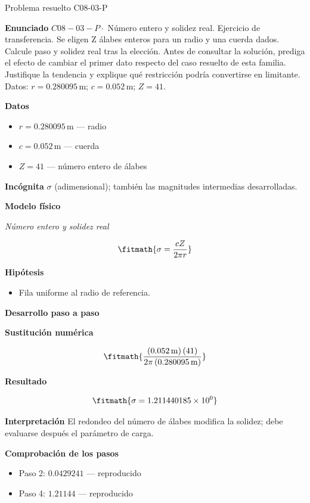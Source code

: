 \documentclass[10pt,openany]{book}
\begin{document}
\begin{studiumworked}{Problema resuelto C08-03-P}


\noindent\textbf{Enunciado}
\(C08-03-P \cdot\) Número entero y solidez real. Ejercicio de transferencia. Se eligen Z álabes enteros para un radio y una cuerda dados. Calcule paso y solidez real tras la elección. Antes de consultar la solución, prediga el efecto de cambiar el primer dato respecto del caso resuelto de esta familia. Justifique la tendencia y explique qué restricción podría convertirse en limitante. Datos: \(r=0.280095\, \mathrm{m}\); \(c=0.052\, \mathrm{m}\); \(Z=41\).

\noindent\textbf{Datos}
\begin{itemize}
\item $r = 0.280095\,\mathrm{m}$ — radio
\item $c = 0.052\,\mathrm{m}$ — cuerda
\item $Z = 41$ — número entero de álabes
\end{itemize}

\noindent\textbf{Incógnita}
$\sigma$ (adimensional); también las magnitudes intermedias desarrolladas.

\noindent\textbf{Modelo físico}

\noindent\textit{Número entero y solidez real}

\[
\fitmath{\sigma=\frac{c Z}{2 \pi r}}
\]

\noindent\textbf{Hipótesis}
\begin{itemize}
\item Fila uniforme al radio de referencia.
\end{itemize}

\noindent\textbf{Desarrollo paso a paso}



\noindent\textbf{Sustitución numérica}

\[
\fitmath{\frac{\left(0.052\,\mathrm{m}\right) \left(41\right)}{2 \pi \left(0.280095\,\mathrm{m}\right)}}
\]

\noindent\textbf{Resultado}

\[
\fitmath{\sigma=1.211440185\times10^{0}}
\]

\noindent\textbf{Interpretación}
El redondeo del número de álabes modifica la solidez; debe evaluarse después el parámetro de carga.

\noindent\textbf{Comprobación de los pasos}
\begin{itemize}
\item Paso 2: $0.0429241$ — reproducido
\item Paso 4: $1.21144$ — reproducido
\end{itemize}


\end{studiumworked}
\end{document}
